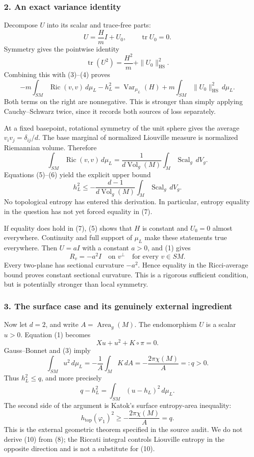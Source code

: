 \documentclass[11pt]{article}
\begin{document}
\subsubsection{2. An exact variance identity}
Decompose $U$ into its scalar and trace-free parts:
\[
 U=\frac{H}{m}I+U_0,\qquad\operatorname{tr}U_0=0.
\]
Symmetry gives the pointwise identity
\[
 \operatorname{tr}(U^2)=\frac{H^2}{m}+\|U_0\|_{\mathrm{HS}}^2.
\]
Combining this with (3)--(4) proves
\[
 \boxed{
 -m\int_{SM}\operatorname{Ric}(v,v)\,d\mu_L-h_L^2
 =\operatorname{Var}_{\mu_L}(H)
  +m\int_{SM}\|U_0\|_{\mathrm{HS}}^2\,d\mu_L.}
                                                               \tag{5}
\]
Both terms on the right are nonnegative. This is stronger than simply applying Cauchy--Schwarz twice, since it records both sources of loss separately.

At a fixed basepoint, rotational symmetry of the unit sphere gives the average $v_iv_j=\delta_{ij}/d$. The base marginal of normalized Liouville measure is normalized Riemannian volume. Therefore
\[
 \int_{SM}\operatorname{Ric}(v,v)\,d\mu_L
 =\frac1{d\operatorname{Vol}_g(M)}\int_M\operatorname{Scal}_g\,dV_g.
                                                               \tag{6}
\]
Equations (5)--(6) yield the explicit upper bound
\[
 h_L^2\leq-
 \frac{d-1}{d\operatorname{Vol}_g(M)}
 \int_M\operatorname{Scal}_g\,dV_g.                       \tag{7}
\]
No topological entropy has entered this derivation. In particular, entropy equality in the question has not yet forced equality in (7).

If equality does hold in (7), (5) shows that $H$ is constant and $U_0=0$ almost everywhere. Continuity and full support of $\mu_L$ make these statements true everywhere. Then $U=aI$ with a constant $a>0$, and (1) gives
\[
 R_v=-a^2 I\quad\text{on }v^\perp\quad\text{for every }v\in SM.
\]
Every two-plane has sectional curvature $-a^2$. Hence equality in the Ricci-average bound proves constant sectional curvature. This is a rigorous sufficient condition, but is potentially stronger than local symmetry.

\subsubsection{3. The surface case and its genuinely external ingredient}
Now let $d=2$, and write $A=\operatorname{Area}_g(M)$. The endomorphism $U$ is a scalar $u>0$. Equation (1) becomes
\[
 Xu+u^2+K\circ\pi=0.
\]
Gauss--Bonnet and (3) imply
\[
 \int_{SM}u^2\,d\mu_L=-\frac1A\int_M K\,dA
 =-\frac{2\pi\chi(M)}A=:q>0.                            \tag{8}
\]
Thus $h_L^2\leq q$, and more precisely
\[
 q-h_L^2=\int_{SM}(u-h_L)^2\,d\mu_L.                    \tag{9}
\]
The second side of the argument is Katok's surface entropy-area inequality:
\[
 h_{\mathrm{top}}(\varphi_1)^2\geq
 -\frac{2\pi\chi(M)}A=q.                                \tag{10}
\]
This is the external geometric theorem specified in the source audit. We do not derive (10) from (8); the Riccati integral controls Liouville entropy in the opposite direction and is not a substitute for (10).
\end{document}
